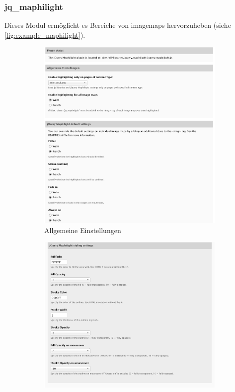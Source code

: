 \newpage
\subsubsection{jq\_maphilight}\label{subsub:maphilight}
Dieses Modul ermöglicht es Bereiche von \glspl{imagemap} hervorzuheben (siehe \cref{fig:example_maphilight}).

\begin{figure}[H]
	\centering
	\begin{subfigure}[b]{0.3\textwidth}
		\centering
		\includegraphics[height=0.20\textheight]{images/config_maphilight1}
		\caption[]{Allgemeine Einstellungen}
		\label{fig:config_maphilight_general}
	\end{subfigure}
	\begin{subfigure}[b]{0.4\textwidth}
		\centering
		\includegraphics[height=0.20\textheight]{images/config_maphilight2}

\end{subfigure}
\end{figure}
